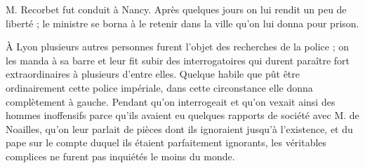 M. Recorbet fut conduit à Nancy. Après quelques jours on lui rendit un peu de liberté ; le ministre se borna à le retenir dans la ville qu'on lui donna pour prison.

À Lyon plusieurs autres personnes furent l'objet des recherches de la police ; on les manda à sa barre et leur fit subir des interrogatoires qui durent paraître fort extraordinaires à plusieurs d'entre elles. Quelque habile que pût être ordinairement cette police impériale, dans cette circonstance elle donna complètement à gauche. Pendant qu'on interrogeait et qu'on vexait ainsi des hommes inoffensifs parce qu'ils avaient eu quelques rapports de société avec M. de Noailles, qu'on leur parlait de pièces dont ils ignoraient jusqu'à l'existence, et du pape sur le compte duquel ils étaient parfaitement ignorants, les véritables complices ne furent pas inquiétés le moins du monde.

